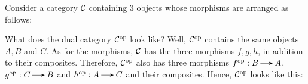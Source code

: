     \begin{example}
        Consider a category $\mathcal{C}$ containing $3$ objects
        whose morphisms are arranged as follows:
        \begin{center}
        \end{center}
        What does the dual category $\mathcal{C}^{\mathrm{op}}$ look like? Well, $\mathcal{C}^{\mathrm{op}}$
        contains the same objects $A, B$ and $C$. As for the morphisms, $\mathcal{C}$
        has the three morphisms $f, g, h$, in addition to their composites.
        Therefore, $\mathcal{C}^{\mathrm{op}}$ also has three morphisms 
        $f\op:B \to A$, $g\op: C \to
        B$ and $h\op: A \to C$ and their composites. Hence, $\mathcal{C}^{\mathrm{op}}$ looks like this:
        \begin{center}
        \end{center}
    \end{example}

